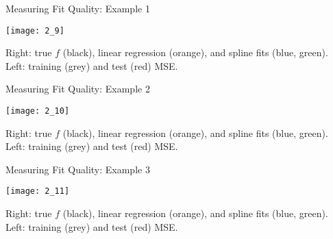 \documentclass[mathserif, aspectratio=169]{beamer}
\begin{document}
\begin{frame}{Measuring Fit Quality: Example 1}
	\vspace{-5mm}
	\begin{center}
		\texttt{[image: 2\_9]}

		Right: true $f$ (black), linear regression (orange), and spline fits (blue, green).\\
		Left: training (grey) and test (red) MSE.
	\end{center}
\end{frame}

\begin{frame}{Measuring Fit Quality: Example 2}
	\vspace{-5mm}
	\begin{center}
		\texttt{[image: 2\_10]}

		Right: true $f$ (black), linear regression (orange), and spline fits (blue, green).\\
		Left: training (grey) and test (red) MSE.
	\end{center}
\end{frame}

\begin{frame}{Measuring Fit Quality: Example 3}
	\vspace{-5mm}
	\begin{center}
		\texttt{[image: 2\_11]}

		Right: true $f$ (black), linear regression (orange), and spline fits (blue, green).\\
		Left: training (grey) and test (red) MSE.
	\end{center}
\end{frame}
\end{document}
